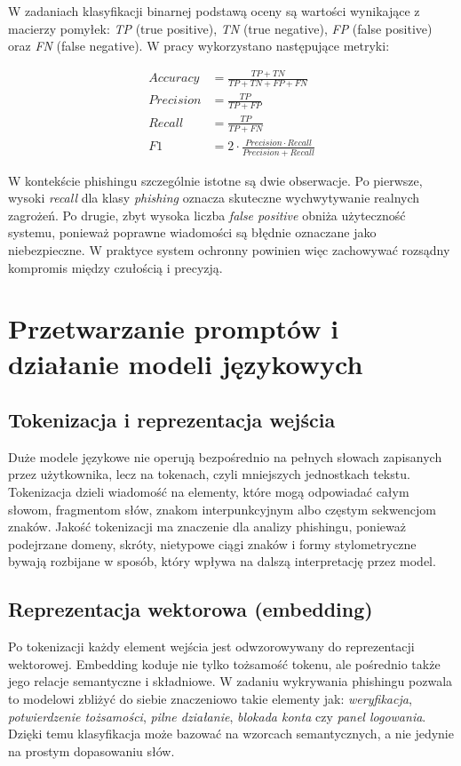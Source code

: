 \documentclass[12pt,a4paper,openany]{report}
\begin{document}
W zadaniach klasyfikacji binarnej podstawą oceny są wartości wynikające z macierzy pomyłek: \textit{TP} (true positive), \textit{TN} (true negative), \textit{FP} (false positive) oraz \textit{FN} (false negative). W pracy wykorzystano następujące metryki:

\begin{align*}
Accuracy &= \frac{TP + TN}{TP + TN + FP + FN} \\
Precision &= \frac{TP}{TP + FP} \\
Recall &= \frac{TP}{TP + FN} \\
F1 &= 2 \cdot \frac{Precision \cdot Recall}{Precision + Recall}
\end{align*}

W kontekście phishingu szczególnie istotne są dwie obserwacje. Po pierwsze, wysoki \textit{recall} dla klasy \textit{phishing} oznacza skuteczne wychwytywanie realnych zagrożeń. Po drugie, zbyt wysoka liczba \textit{false positive} obniża użyteczność systemu, ponieważ poprawne wiadomości są błędnie oznaczane jako niebezpieczne. W praktyce system ochronny powinien więc zachowywać rozsądny kompromis między czułością i precyzją.

\chapter{Przetwarzanie promptów i działanie modeli językowych}

\section{Tokenizacja i reprezentacja wejścia}

Duże modele językowe nie operują bezpośrednio na pełnych słowach zapisanych przez użytkownika, lecz na tokenach, czyli mniejszych jednostkach tekstu. Tokenizacja dzieli wiadomość na elementy, które mogą odpowiadać całym słowom, fragmentom słów, znakom interpunkcyjnym albo częstym sekwencjom znaków. Jakość tokenizacji ma znaczenie dla analizy phishingu, ponieważ podejrzane domeny, skróty, nietypowe ciągi znaków i formy stylometryczne bywają rozbijane w sposób, który wpływa na dalszą interpretację przez model.

\section{Reprezentacja wektorowa (embedding)}

Po tokenizacji każdy element wejścia jest odwzorowywany do reprezentacji wektorowej. Embedding koduje nie tylko tożsamość tokenu, ale pośrednio także jego relacje semantyczne i składniowe. W zadaniu wykrywania phishingu pozwala to modelowi zbliżyć do siebie znaczeniowo takie elementy jak: \textit{weryfikacja}, \textit{potwierdzenie tożsamości}, \textit{pilne działanie}, \textit{blokada konta} czy \textit{panel logowania}. Dzięki temu klasyfikacja może bazować na wzorcach semantycznych, a nie jedynie na prostym dopasowaniu słów.
\end{document}
